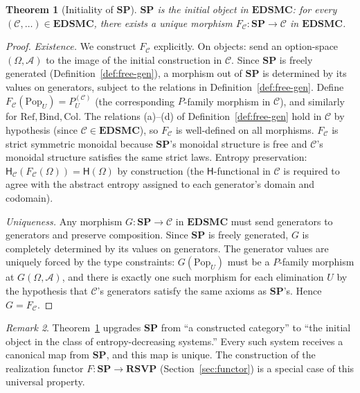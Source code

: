 \documentclass[12pt,a4paper]{article}
\newtheorem{theorem}{Theorem}[section]
\theoremstyle{definition}
\theoremstyle{remark}
\newtheorem{remark}[theorem]{Remark}
\newcommand{\Ent}{\ensuremath{\mathsf{H}}}
\newcommand{\SP}{\mathbf{SP}}
\newcommand{\RSVP}{\mathbf{RSVP}}
\newcommand{\EDSMC}{\mathbf{EDSMC}}
\newcommand{\Pop}{\ensuremath{\mathrm{Pop}}}
\newcommand{\RefOp}{\ensuremath{\mathrm{Ref}}}
\newcommand{\Bind}{\ensuremath{\mathrm{Bind}}}
\newcommand{\Col}{\ensuremath{\mathrm{Col}}}
\begin{document}
\begin{theorem}[Initiality of $\SP$]
\label{thm:initial}
$\SP$ is the initial object in $\EDSMC$: for every $(\mathcal{C},\ldots)\in\EDSMC$,
there exists a unique morphism $F_\mathcal{C}:\SP\to\mathcal{C}$ in $\EDSMC$.
\end{theorem}

\begin{proof}
\textit{Existence.} We construct $F_\mathcal{C}$ explicitly. On objects: send an
option-space $(\Omega,\mathcal{A})$ to the image of the initial construction in
$\mathcal{C}$. Since $\SP$ is freely generated (Definition~\ref{def:free-gen}), a
morphism out of $\SP$ is determined by its values on generators, subject to the
relations in Definition~\ref{def:free-gen}. Define $F_\mathcal{C}(\Pop_U)=P_U^{(\mathcal{C})}$
(the corresponding $P$-family morphism in $\mathcal{C}$), and similarly for $\RefOp,\Bind,\Col$.
The relations (a)--(d) of Definition~\ref{def:free-gen} hold in $\mathcal{C}$ by hypothesis
(since $\mathcal{C}\in\EDSMC$), so $F_\mathcal{C}$ is well-defined on all morphisms.
$F_\mathcal{C}$ is strict symmetric monoidal because $\SP$'s monoidal structure is
free and $\mathcal{C}$'s monoidal structure satisfies the same strict laws.
Entropy preservation: $\Ent_\mathcal{C}(F_\mathcal{C}(\Omega))=\Ent(\Omega)$ by
construction (the $\Ent$-functional in $\mathcal{C}$ is required to agree with
the abstract entropy assigned to each generator's domain and codomain).

\textit{Uniqueness.} Any morphism $G:\SP\to\mathcal{C}$ in $\EDSMC$ must send
generators to generators and preserve composition. Since $\SP$ is freely generated,
$G$ is completely determined by its values on generators. The generator values are
uniquely forced by the type constraints: $G(\Pop_U)$ must be a $P$-family morphism
at $G(\Omega,\mathcal{A})$, and there is exactly one such morphism for each
elimination $U$ by the hypothesis that $\mathcal{C}$'s generators satisfy the same
axioms as $\SP$'s. Hence $G=F_\mathcal{C}$.
\end{proof}

\begin{remark}
Theorem~\ref{thm:initial} upgrades $\SP$ from ``a constructed category'' to ``the
initial object in the class of entropy-decreasing systems.'' Every such system
receives a canonical map from $\SP$, and this map is unique. The construction of the
realization functor $F:\SP\to\RSVP$ (Section~\ref{sec:functor}) is a special case of
this universal property.
\end{remark}
\end{document}
